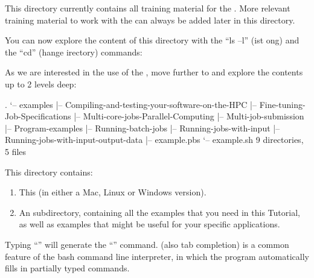This directory currently contains all training material for the .
More relevant training material to work with the \hpc can always be added
later in this directory.

You can now explore the content of this directory with the ``ls --l''
(ist ong) and the ``cd'' (hange
irectory) commands:

As we are interested in the use of the , move further to
 and explore the contents up to 2 levels deep:

\begin{prompt}
.
`-- examples
    |-- Compiling-and-testing-your-software-on-the-HPC
    |-- Fine-tuning-Job-Specifications
    |-- Multi-core-jobs-Parallel-Computing
    |-- Multi-job-submission
    |-- Program-examples
    |-- Running-batch-jobs
    |-- Running-jobs-with-input
    |-- Running-jobs-with-input-output-data
    |-- example.pbs
    `-- example.sh
9 directories, 5 files
\end{prompt}

This directory contains:

\begin{enumerate}
  \item This  (in either a Mac, Linux or Windows version).
  \item An  subdirectory, containing all the
    examples that you need in this Tutorial, as well as examples that might be
    useful for your specific applications.
\end{enumerate}

\begin{prompt}
\end{prompt}

\begin{tip}
Typing ``'' will generate the
``'' command. (also tab completion) is a common feature of the bash command line
interpreter, in which the program automatically fills in partially typed
commands.
\end{tip}

